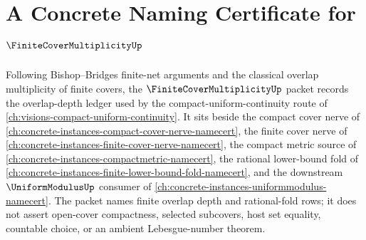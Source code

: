 \chapter{A Concrete Naming Certificate for $\FiniteCoverMultiplicityUp$}
\label{ch:concrete-instances-finite-cover-multiplicity-namecert}

Following Bishop--Bridges finite-net arguments and the classical overlap multiplicity of finite covers, the $\FiniteCoverMultiplicityUp$ packet records the overlap-depth ledger used by the compact-uniform-continuity route of \autoref{ch:visions-compact-uniform-continuity}. It sits beside the compact cover nerve of \autoref{ch:concrete-instances-compact-cover-nerve-namecert}, the finite cover nerve of \autoref{ch:concrete-instances-finite-cover-nerve-namecert}, the compact metric source of \autoref{ch:concrete-instances-compactmetric-namecert}, the rational lower-bound fold of \autoref{ch:concrete-instances-finite-lower-bound-fold-namecert}, and the downstream $\UniformModulusUp$ consumer of \autoref{ch:concrete-instances-uniformmodulus-namecert}. The packet names finite overlap depth and rational-fold rows; it does not assert open-cover compactness, selected subcovers, host set equality, countable choice, or an ambient Lebesgue-number theorem.

